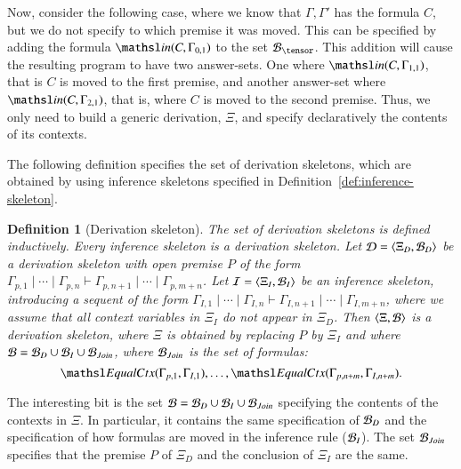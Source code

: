 \documentclass{new_tlp}
\newcommand{\emp}[1]{\ensuremath{{\tsl{emp}(\ensuremath{#1})}}}
\newcommand{\union}[3]{\ensuremath{{\tsl{union}(\ensuremath{#1},\ensuremath{#2},\ensuremath{ #3})}}}
\newcommand{\In}[2]{\ensuremath{\tsl{in}(\ensuremath{#1},\ensuremath{#2})}}
\newcommand{\equalCtx}[2]{\ensuremath{\tsl{EqualCtx}(\ensuremath{#1},\ensuremath{#2})}}
\newtheorem{definition}[theorem]{Definition}
\begin{document}
Now, consider the following case, where we know that $\Gamma, \Gamma'$ has the formula 
$C$, but we do not specify to which premise it was moved. This can be specified by adding
the formula $\In{C}{\Gamma_{0,1}}$ to the set $\Bscr_\tensor$. This addition will cause the resulting program to have
two answer-sets. One where $\In{C}{\Gamma_{1,1}}$, that is $C$ is moved to the first premise, 
and another answer-set where $\In{C}{\Gamma_{2,1}}$, that is, where $C$ is moved to the second
premise. Thus, we only need to build a generic derivation, $\Xi$, and specify declaratively
the contents of its contexts. 

The following definition specifies the set of derivation skeletons, which are obtained 
by using inference skeletons specified in Definition~\ref{def:inference-skeleton}.

\begin{definition}[Derivation skeleton]
The set of \emph{derivation skeletons} is defined inductively.
Every inference skeleton is a derivation skeleton. 
Let $\Dscr = \tup{\Xi_D, \Bscr_D}$ be a derivation skeleton with open premise $P$
of the form $\Gamma_{p,1} \mid \cdots \mid \Gamma_{p,n} \vdash \Gamma_{p,n + 1} \mid \cdots \mid \Gamma_{p,m + n}$.
Let $\Iscr = \tup{\Xi_I, \Bscr_I}$ be an inference skeleton, introducing a sequent of the form
$\Gamma_{I,1} \mid \cdots \mid \Gamma_{I,n} \vdash \Gamma_{I,n + 1} \mid \cdots \mid \Gamma_{I,m + n}$, 
where we assume that all context variables in $\Xi_I$ do not appear in $\Xi_D$.
Then  $\tup{\Xi, \Bscr}$
is a derivation skeleton, where $\Xi$ is obtained by replacing $P$ by $\Xi_I$ and 
where $\Bscr = \Bscr_D \cup \Bscr_I \cup \Bscr_{Join}$, where $\Bscr_{Join}$ is the 
set of formulas:
\[
 \equalCtx{\Gamma_{p,1}}{\Gamma_{I,1}}, \ldots, \equalCtx{\Gamma_{p,n+m}}{\Gamma_{I,n+m}}.
\]
%
\end{definition}

The interesting bit is the set $\Bscr = \Bscr_D \cup \Bscr_I \cup \Bscr_{Join}$ specifying 
the contents of the contexts in $\Xi$. In particular, it contains the same specification of 
$\Bscr_D$ and the specification of how formulas are moved in the inference rule ($\Bscr_I$). 
The set $\Bscr_{Join}$ specifies that the premise $P$ of $\Xi_D$ and the conclusion of $\Xi_I$
are the same.
\end{document}
